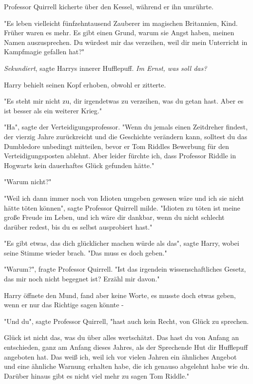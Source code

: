 {Professor Quirrell kicherte über den Kessel, während er ihn umrührte.

"Es leben vielleicht fünfzehntausend Zauberer im magischen Britannien, Kind. Früher waren es mehr. Es gibt einen Grund, warum sie Angst haben, meinen Namen auszusprechen. Du würdest mir das verzeihen, weil dir mein Unterricht in Kampfmagie gefallen hat?"

\emph{Sekundiert}, sagte Harrys innerer Hufflepuff. \emph{Im Ernst, was soll das?}

Harry behielt seinen Kopf erhoben, obwohl er zitterte.

"Es steht mir nicht zu, dir irgendetwas zu verzeihen, was du getan hast. Aber es ist besser als ein weiterer Krieg."

"Ha", sagte der Verteidigungsprofessor. "Wenn du jemals einen Zeitdreher findest, der vierzig Jahre zurückreicht und die Geschichte verändern kann, solltest du das Dumbledore unbedingt mitteilen, bevor er Tom Riddles Bewerbung für den Verteidigungsposten ablehnt. Aber leider fürchte ich, dass Professor Riddle in Hogwarts kein dauerhaftes Glück gefunden hätte."

"Warum nicht?"

"Weil ich dann immer noch von Idioten umgeben gewesen wäre und ich sie nicht hätte töten können", sagte Professor Quirrell milde. "Idioten zu töten ist meine große Freude im Leben, und ich wäre dir dankbar, wenn du nicht schlecht darüber redest, bis du es selbst ausprobiert hast."

"Es gibt etwas, das dich glücklicher machen würde als das", sagte Harry, wobei seine Stimme wieder brach. "Das muss es doch geben."

"Warum?", fragte Professor Quirrell. "Ist das irgendein wissenschaftliches Gesetz, das mir noch nicht begegnet ist? Erzähl mir davon."

Harry öffnete den Mund, fand aber keine Worte, es musste doch etwas geben, wenn er nur das Richtige sagen könnte -

"Und du", sagte Professor Quirrell, "hast auch kein Recht, von Glück zu sprechen.

Glück ist nicht das, was du über alles wertschätzt. Das hast du von Anfang an entschieden, ganz am Anfang dieses Jahres, als der Sprechende Hut dir Hufflepuff angeboten hat. Das weiß ich, weil ich vor vielen Jahren ein ähnliches Angebot und eine ähnliche Warnung erhalten habe, die ich genauso abgelehnt habe wie du. Darüber hinaus gibt es nicht viel mehr zu sagen Tom Riddle."

}
